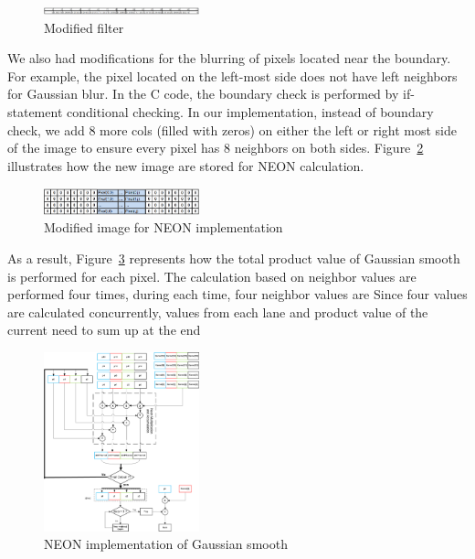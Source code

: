 \begin{figure}
\centering

\includegraphics[width=0.4\textwidth]{drawings/filter}
\caption{Modified filter}
\label{fig:newfilter}
\end{figure}

We also had modifications for the blurring of pixels located near the boundary. For example, the pixel located on the left-most side does not have left neighbors for Gaussian blur. In the C code, the boundary check is performed by if-statement conditional checking. In our implementation, instead of boundary check, we add 8 more cols (filled with zeros) on either the left or right most side of the image to ensure every pixel has 8 neighbors on both sides. Figure~\ref{fig:addcols} illustrates how the new image are stored for NEON calculation. 

\begin{figure}
\centering
\includegraphics[width=0.4\textwidth]{drawings/new_cols}
\caption{Modified image for NEON implementation}
\label{fig:addcols}
\end{figure}

As a result, Figure~\ref{fig:neon} represents how the total product value of Gaussian smooth is performed for each pixel. The calculation based on neighbor values are performed four times, during each time, four neighbor values are  Since four values are calculated concurrently, values from each lane and product value of the current  need to sum up at the end

\begin{figure}
\centering
\includegraphics[width=0.4\textwidth]{drawings/neon}
\caption{NEON implementation of Gaussian smooth}
\label{fig:neon}
\end{figure}
